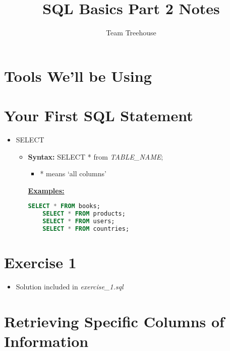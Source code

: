 \documentclass[12pt]{article}
\begin{document}
\title{SQL Basics Part 2 Notes}
\author{Team Treehouse}
\maketitle

\bigskip

\section{Tools We'll be Using}

\bigskip

\section{Your First SQL Statement}

\begin{itemize}
    \item SELECT
    \begin{itemize}
        \item \textbf{Syntax:} SELECT * from \textit{TABLE\_NAME};
        \begin{itemize}
            \item * means `all columns'
        \end{itemize}

        \bigskip

        \underline{\textbf{Examples:}}

    \begin{lstlisting}[language=SQL]
    SELECT * FROM books;
    SELECT * FROM products;
    SELECT * FROM users;
    SELECT * FROM countries;
    \end{lstlisting}
    \end{itemize}
\end{itemize}

\bigskip

\section{Exercise 1}

\bigskip

\begin{itemize}
    \item Solution included in \textit{exercise\_1.sql}
\end{itemize}

\bigskip

\section{Retrieving Specific Columns of Information}
\end{document}
